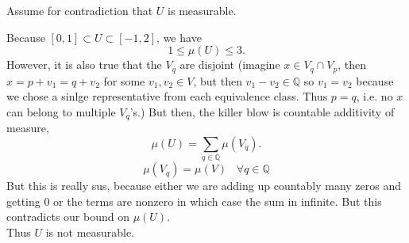 \documentclass{article}[11pt]
\begin{document}
Assume for contradiction that $U$ is measurable.

Because $[0,1] \subset U \subset [-1,2]$, we have $$ 1 \le \mu(U) \le 3.$$
However, it is also true that the $V_q$ are disjoint (imagine $x \in V_q \cap
V_p$, then $x = p+v_1 = q+v_2$ for some $v_1,v_2 \in V$, but then $v_1 - v_2
\in \mathbb{Q}$ so $v_1 = v_2$ because we chose a sinlge representative from
each equivalence class. Thus $p=q$, i.e. no $x$ can belong to multiple
$V_q$'s.)
But then, the killer blow is countable additivity of measure,
$$ \mu(U) = \sum_{q\in \mathbb{Q}} \mu(V_q).$$
$$\mu(V_q) = \mu(V) \;\;\;\forall q \in \mathbb{Q}$$
But this is really sus, because either we are adding up countably many zeros
and getting $0$ or the terms are nonzero in which case the sum in infinite.
But this contradicts our bound on $\mu(U)$.\\
Thus $U$ is not measurable.
\end{document}
